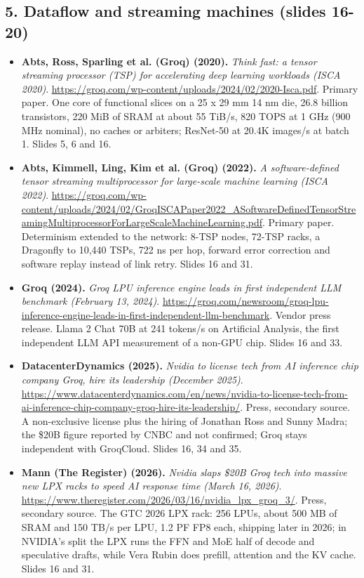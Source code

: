 \documentclass[11pt,letterpaper]{article}
\begin{document}
\subsection*{5. Dataflow and streaming machines (slides 16-20)}
\begin{itemize}[leftmargin=1.2em,itemsep=3pt]\sloppy
\item \textbf{Abts, Ross, Sparling et al. (Groq) (2020).} \textit{Think fast: a tensor streaming processor (TSP) for accelerating deep learning workloads (ISCA 2020)}. \url{https://groq.com/wp-content/uploads/2024/02/2020-Isca.pdf}. Primary paper. One core of functional slices on a 25 x 29 mm 14 nm die, 26.8 billion transistors, 220 MiB of SRAM at about 55 TiB/s, 820 TOPS at 1 GHz (900 MHz nominal), no caches or arbiters; ResNet-50 at 20.4K images/s at batch 1. Slides 5, 6 and 16.
\item \textbf{Abts, Kimmell, Ling, Kim et al. (Groq) (2022).} \textit{A software-defined tensor streaming multiprocessor for large-scale machine learning (ISCA 2022)}. \url{https://groq.com/wp-content/uploads/2024/02/GroqISCAPaper2022_ASoftwareDefinedTensorStreamingMultiprocessorForLargeScaleMachineLearning.pdf}. Primary paper. Determinism extended to the network: 8-TSP nodes, 72-TSP racks, a Dragonfly to 10,440 TSPs, 722 ns per hop, forward error correction and software replay instead of link retry. Slides 16 and 31.
\item \textbf{Groq (2024).} \textit{Groq LPU inference engine leads in first independent LLM benchmark (February 13, 2024)}. \url{https://groq.com/newsroom/groq-lpu-inference-engine-leads-in-first-independent-llm-benchmark}. Vendor press release. Llama 2 Chat 70B at 241 tokens/s on Artificial Analysis, the first independent LLM API measurement of a non-GPU chip. Slides 16 and 33.
\item \textbf{DatacenterDynamics (2025).} \textit{Nvidia to license tech from AI inference chip company Groq, hire its leadership (December 2025)}. \url{https://www.datacenterdynamics.com/en/news/nvidia-to-license-tech-from-ai-inference-chip-company-groq-hire-its-leadership/}. Press, secondary source. A non-exclusive license plus the hiring of Jonathan Ross and Sunny Madra; the \$20B figure reported by CNBC and not confirmed; Groq stays independent with GroqCloud. Slides 16, 34 and 35.
\item \textbf{Mann (The Register) (2026).} \textit{Nvidia slaps \$20B Groq tech into massive new LPX racks to speed AI response time (March 16, 2026)}. \url{https://www.theregister.com/2026/03/16/nvidia_lpx_groq_3/}. Press, secondary source. The GTC 2026 LPX rack: 256 LPUs, about 500 MB of SRAM and 150 TB/s per LPU, 1.2 PF FP8 each, shipping later in 2026; in NVIDIA's split the LPX runs the FFN and MoE half of decode and speculative drafts, while Vera Rubin does prefill, attention and the KV cache. Slides 16 and 31.

\end{itemize}
\end{document}
